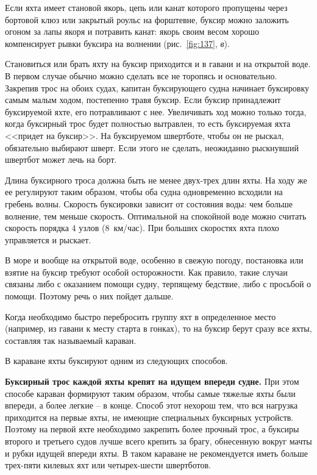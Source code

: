 \documentclass[a4paper, 12pt, twoside, final]{scrbook}
\begin{document}
Если яхта имеет становой якорь, цепь или канат которого пропущены через бортовой клюз или закрытый роульс на форштевне, буксир можно заложить огоном за лапы якоря и потравить канат: якорь своим весом хорошо компенсирует рывки буксира на волнении (рис.~\ref{fig:137}, \textit{в}).

Становиться или брать яхту на буксир приходится и в гавани и на открытой воде. В первом случае обычно можно сделать все не торопясь и основательно. Закрепив трос на обоих судах, капитан буксирующего судна начинает буксировку самым малым ходом, постепенно травя буксир. Если буксир принадлежит буксируемой яхте, его потравливают с нее. Увеличивать ход можно только тогда, когда буксирный трос будет полностью вытравлен, то есть буксируемая яхта <<придет на буксир>>. На буксируемом швертботе, чтобы он не рыскал, обязательно выбирают шверт. Если этого не сделать, неожиданно рыскнувший швертбот может лечь на борт.

Длина буксирного троса должна быть не менее двух-трех длин яхты. На ходу же ее регулируют таким образом, чтобы оба судна одновременно всходили на гребень волны. Скорость буксировки зависит от состояния воды: чем больше волнение, тем меньше скорость. Оптимальной на спокойной воде можно считать скорость порядка 4 узлов (8~км/час). При больших скоростях яхта плохо управляется и рыскает.

В море и вообще на открытой воде, особенно в свежую погоду, постановка или взятие на буксир требуют особой осторожности. Как правило, такие случаи связаны либо с оказанием помощи судну, терпящему бедствие, либо с просьбой о помощи. Поэтому речь о них пойдет дальше.

Когда необходимо быстро перебросить группу яхт в определенное место (например, из гавани к месту старта в гонках), то на буксир берут сразу все яхты, составляя так называемый караван.

В караване яхты буксируют одним из следующих способов.

\textbf{Буксирный трос каждой яхты крепят на идущем впереди судне.} При этом способе караван формируют таким образом, чтобы самые тяжелые яхты были впереди, а более легкие \--- в конце. Способ этот нехорош тем, что вся нагрузка приходится на первые яхты, не имеющие специальных буксирных устройств. Поэтому на первой яхте необходимо закрепить более прочный трос, а буксиры второго и третьего судов лучше всего крепить за брагу, обнесенную вокруг мачты и рубки идущей впереди яхты. В таком караване не рекомендуется иметь больше трех\--пяти килевых яхт или четырех\--шести швертботов.
\end{document}
